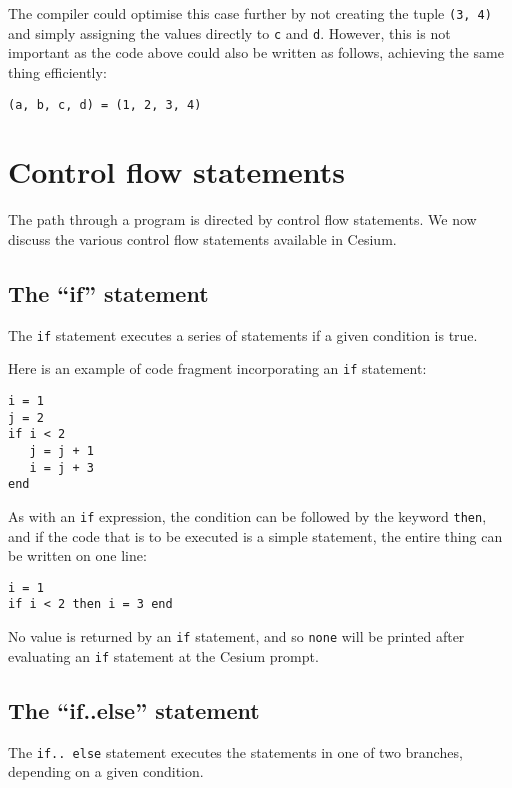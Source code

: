 \documentclass[a4paper,10pt]{article}
\newcommand{\code}{\lstinline}
\begin{document}
{The compiler could optimise this case further by not creating the tuple \code{(3, 4)} and simply
assigning the values directly to \code{c} and \code{d}. However, this is not important as the
code above could also be written as follows, achieving the same thing efficiently:

\begin{lstlisting}
(a, b, c, d) = (1, 2, 3, 4)
\end{lstlisting}

\section{Control flow statements}

The path through a program is directed by control flow statements. We now discuss the various 
control flow statements available in Cesium.

\subsection{The ``if'' statement}

The \code{if} statement executes a series of statements if a given condition is true.

Here is an example of code fragment incorporating an \code{if} statement:

\begin{lstlisting}
i = 1
j = 2
if i < 2
   j = j + 1
   i = j + 3
end
\end{lstlisting}

As with an \code{if} expression, the condition can be followed by the keyword \code{then}, and if 
the code that is to be executed is a simple statement, the entire thing can be written on one line:

\begin{lstlisting}
i = 1
if i < 2 then i = 3 end
\end{lstlisting}

No value is returned by an \code{if} statement, and so \code{none} will be printed after
evaluating an \code{if} statement at the Cesium prompt.

\subsection{The ``if..else'' statement}

The \code{if.. else} statement executes the statements in one of two branches, depending on a given
condition.

}
\end{document}
